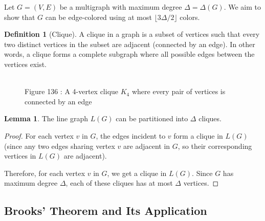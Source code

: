 \documentclass{article}
\theoremstyle{definition}
\newtheorem{lemma}{Lemma}
\newtheorem{definition}{Definition}
\begin{document}
Let $G = (V, E)$ be a multigraph with maximum degree $\Delta = \Delta(G)$. We aim to show that $G$ can be edge-colored using at most $\lfloor 3\Delta/2 \rfloor$ colors.

\begin{definition}[Clique]
A clique in a graph is a subset of vertices such that every two distinct vertices in the subset are adjacent (connected by an edge). In other words, a clique forms a complete subgraph where all possible edges between the vertices exist.
\end{definition}

\begin{figure}[ht]
\centering
{}
\\
\small Figure 136 : {A 4-vertex clique $K_4$ where every pair of vertices is connected by an edge}
\end{figure}

\begin{lemma}
The line graph $L(G)$ can be partitioned into $\Delta$ cliques.
\end{lemma}

\begin{proof}
For each vertex $v$ in $G$, the edges incident to $v$ form a clique in $L(G)$ (since any two edges sharing vertex $v$ are adjacent in $G$, so their corresponding vertices in $L(G)$ are adjacent).

Therefore, for each vertex $v$ in $G$, we get a clique in $L(G)$. Since $G$ has maximum degree $\Delta$, each of these cliques has at most $\Delta$ vertices.
\end{proof}

\subsection* {Brooks' Theorem and Its Application}
\end{document}
